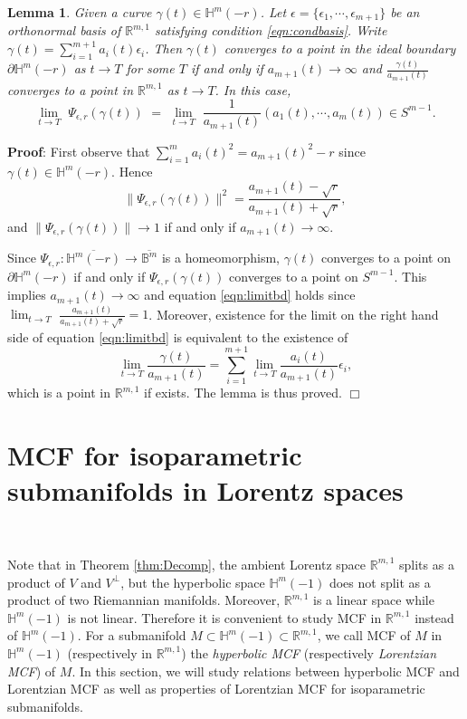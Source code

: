 \documentclass[12pt]{article}
\newtheorem{lem}{Lemma}[section]
\begin{document}
\begin{lem} \label{lem:convBD}
Given a curve $\gamma(t) \in \mathbb{H}^{m}(-r)$.
Let $\epsilon=\{\epsilon_1, \cdots, \epsilon_{m+1} \}$
be an orthonormal basis of $\mathbb{R}^{m,1}$ satisfying condition \eqref{eqn:condbasis}.
Write $\gamma(t) = \sum_{i=1}^{m+1} a_i(t) \epsilon_i$. Then $\gamma(t)$ converges to a point
in the ideal boundary $\partial \mathbb{H}^{m}(-r)$ as $t \rightarrow T$ for some $T$ if and only if
$ a_{m+1}(t) \rightarrow \infty$ and $\frac{\gamma(t)}{a_{m+1}(t)}$ converges to a point in
$\mathbb{R}^{m,1}$ as $t \rightarrow T$. In this case,
\begin{equation} \label{eqn:limitbd}
 \lim_{t \rightarrow T} \,\, \Psi_{\epsilon, r}(\gamma(t))
       \,\, = \,\,\lim_{t \rightarrow T} \,\, \frac{1}{a_{m+1}(t)} (a_1(t), \cdots, a_m(t)) \in S^{m-1}.
\end{equation}
\end{lem}
\noindent
{\bf Proof}:
First observe that $\sum_{i=1}^m a_i(t)^2 = a_{m+1}(t)^2 -r$ since $\gamma(t) \in \mathbb{H}^{m}(-r)$. Hence
\[ \|\Psi_{\epsilon, r}(\gamma(t))\|^2 = \frac{a_{m+1}(t) - \sqrt{r}}{a_{m+1}(t) + \sqrt{r}}, \]
and $\|\Psi_{\epsilon, r}(\gamma(t))\| \rightarrow 1$ if and only if
$ a_{m+1}(t) \rightarrow \infty$.

Since $\Psi_{\epsilon, r}: \overline{\mathbb{H}^{m}(-r)} \longrightarrow \overline{\mathbb{B}^m}$
is a homeomorphism, $\gamma(t)$ converges to a point
on $\partial \mathbb{H}^{m}(-r)$  if and only if $\Psi_{\epsilon, r}(\gamma(t))$ converges to a point
on $S^{m-1}$. This implies $ a_{m+1}(t) \rightarrow \infty$ and
equation \eqref{eqn:limitbd} holds since
$\lim_{t \rightarrow T} \,\, \frac{a_{m+1}(t)}{a_{m+1}(t)+\sqrt{r}} = 1$.
Moreover, existence for the limit on the right hand side of equation \eqref{eqn:limitbd}
is equivalent to the existence of
\[ \lim_{t \rightarrow T} \frac{\gamma(t)}{a_{m+1}(t)} = \sum_{i=1}^{m+1} \lim_{t \rightarrow T} \frac{a_i(t)}{a_{m+1}(t)} \epsilon_i,\]
which is a point in $\mathbb{R}^{m,1}$ if exists.
The lemma is thus proved.
$\Box$


\section{MCF for isoparametric submanifolds in Lorentz spaces} \label{1.10}\

Note that in Theorem \ref{thm:Decomp}, the ambient Lorentz space $\mathbb R^{m,1}$ splits as a product
of $V$ and $V^{\perp}$, but the hyperbolic space $\mathbb{H}^{m}(-1)$ does not split as a product of two Riemannian
manifolds. Moreover, $\mathbb R^{m,1}$ is a linear space while $\mathbb{H}^{m}(-1)$ is not linear.
Therefore it is convenient to study MCF in $\mathbb R^{m,1}$ instead of $\mathbb{H}^{m}(-1)$.
For a submanifold $M \subset \mathbb{H}^{m}(-1) \subset  \mathbb R^{m,1}$, we call MCF of $M$ in $\mathbb{H}^{m}(-1)$ (respectively
in $\mathbb{R}^{m,1}$) the {\it hyperbolic MCF} (respectively {\it Lorentzian MCF}) of $M$.
In this  section, we will study relations between hyperbolic MCF and Lorentzian MCF as well as properties of Lorentzian
MCF for isoparametric submanifolds.
\end{document}
